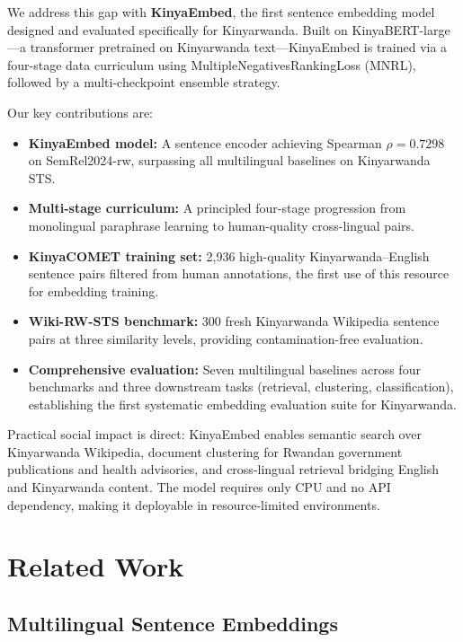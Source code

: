 \documentclass[letterpaper]{article} %
\begin{document}
We address this gap with \textbf{KinyaEmbed}, the first sentence embedding
model designed and evaluated specifically for Kinyarwanda. Built on
KinyaBERT-large \cite{nzeyimana-niyongabo-habimana-2022-kinyabert}---a
transformer pretrained on Kinyarwanda text---KinyaEmbed is trained via a
four-stage data curriculum using MultipleNegativesRankingLoss (MNRL), followed
by a multi-checkpoint ensemble strategy.

Our key contributions are:
\begin{itemize}
  \item \textbf{KinyaEmbed model:} A sentence encoder achieving Spearman
    $\rho = 0.7298$ on SemRel2024-rw, surpassing all multilingual baselines
    on Kinyarwanda STS.
  \item \textbf{Multi-stage curriculum:} A principled four-stage progression
    from monolingual paraphrase learning to human-quality cross-lingual pairs.
  \item \textbf{KinyaCOMET training set:} 2{,}936 high-quality
    Kinyarwanda--English sentence pairs filtered from human annotations,
    the first use of this resource for embedding training.
  \item \textbf{Wiki-RW-STS benchmark:} 300 fresh Kinyarwanda Wikipedia
    sentence pairs at three similarity levels, providing contamination-free
    evaluation.
  \item \textbf{Comprehensive evaluation:} Seven multilingual baselines across
    four benchmarks and three downstream tasks (retrieval, clustering,
    classification), establishing the first systematic embedding evaluation
    suite for Kinyarwanda.
\end{itemize}

Practical social impact is direct: KinyaEmbed enables semantic search over
Kinyarwanda Wikipedia, document clustering for Rwandan government publications
and health advisories, and cross-lingual retrieval bridging English and
Kinyarwanda content. The model requires only CPU and no API dependency, making
it deployable in resource-limited environments.

\section{Related Work}

\subsection{Multilingual Sentence Embeddings}
\end{document}
